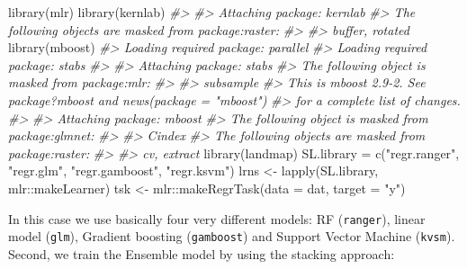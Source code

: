 \documentclass[
  graybox,natbib,nospthms]{svmono}
\newenvironment{Shaded}{\begin{snugshade}}{\end{snugshade}}
\newcommand{\AttributeTok}[1]{\textcolor[rgb]{0.61,0.61,0.61}{#1}}
\newcommand{\CommentTok}[1]{\textcolor[rgb]{0.37,0.37,0.37}{\textit{#1}}}
\newcommand{\FunctionTok}[1]{\textcolor[rgb]{0,0,0}{#1}}
\newcommand{\NormalTok}[1]{#1}
\newcommand{\OtherTok}[1]{\textcolor[rgb]{0.37,0.37,0.37}{#1}}
\newcommand{\SpecialCharTok}[1]{\textcolor[rgb]{0,0,0}{#1}}
\newcommand{\StringTok}[1]{\textcolor[rgb]{0.5,0.5,0.5}{#1}}
\begin{document}
\begin{Shaded}
\begin{Highlighting}[]
\FunctionTok{library}\NormalTok{(mlr)}
\FunctionTok{library}\NormalTok{(kernlab)}
\CommentTok{\#\textgreater{} }
\CommentTok{\#\textgreater{} Attaching package: \textquotesingle{}kernlab\textquotesingle{}}
\CommentTok{\#\textgreater{} The following objects are masked from \textquotesingle{}package:raster\textquotesingle{}:}
\CommentTok{\#\textgreater{} }
\CommentTok{\#\textgreater{}     buffer, rotated}
\FunctionTok{library}\NormalTok{(mboost)}
\CommentTok{\#\textgreater{} Loading required package: parallel}
\CommentTok{\#\textgreater{} Loading required package: stabs}
\CommentTok{\#\textgreater{} }
\CommentTok{\#\textgreater{} Attaching package: \textquotesingle{}stabs\textquotesingle{}}
\CommentTok{\#\textgreater{} The following object is masked from \textquotesingle{}package:mlr\textquotesingle{}:}
\CommentTok{\#\textgreater{} }
\CommentTok{\#\textgreater{}     subsample}
\CommentTok{\#\textgreater{} This is mboost 2.9{-}2. See \textquotesingle{}package?mboost\textquotesingle{} and \textquotesingle{}news(package  = "mboost")\textquotesingle{}}
\CommentTok{\#\textgreater{} for a complete list of changes.}
\CommentTok{\#\textgreater{} }
\CommentTok{\#\textgreater{} Attaching package: \textquotesingle{}mboost\textquotesingle{}}
\CommentTok{\#\textgreater{} The following object is masked from \textquotesingle{}package:glmnet\textquotesingle{}:}
\CommentTok{\#\textgreater{} }
\CommentTok{\#\textgreater{}     Cindex}
\CommentTok{\#\textgreater{} The following objects are masked from \textquotesingle{}package:raster\textquotesingle{}:}
\CommentTok{\#\textgreater{} }
\CommentTok{\#\textgreater{}     cv, extract}
\FunctionTok{library}\NormalTok{(landmap)}
\NormalTok{SL.library }\OtherTok{=} \FunctionTok{c}\NormalTok{(}\StringTok{"regr.ranger"}\NormalTok{, }\StringTok{"regr.glm"}\NormalTok{, }\StringTok{"regr.gamboost"}\NormalTok{, }\StringTok{"regr.ksvm"}\NormalTok{)}
\NormalTok{lrns }\OtherTok{\textless{}{-}} \FunctionTok{lapply}\NormalTok{(SL.library, mlr}\SpecialCharTok{::}\NormalTok{makeLearner)}
\NormalTok{tsk }\OtherTok{\textless{}{-}}\NormalTok{ mlr}\SpecialCharTok{::}\FunctionTok{makeRegrTask}\NormalTok{(}\AttributeTok{data =}\NormalTok{ dat, }\AttributeTok{target =} \StringTok{"y"}\NormalTok{)}
\end{Highlighting}
\end{Shaded}

In this case we use basically four very different models: RF (\texttt{ranger}),
linear model (\texttt{glm}), Gradient boosting (\texttt{gamboost}) and Support Vector
Machine (\texttt{kvsm}). Second, we train the Ensemble model by using the stacking approach:
\end{document}
